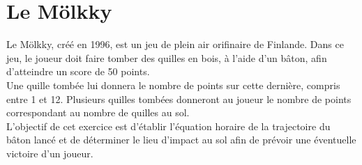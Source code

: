 \documentclass[a4paper,11pt,fleqn]{scrartcl}%
\begin{document}
	\maketitle
\section{Le Mölkky}
Le Mölkky, créé en 1996, est un jeu de plein air orifinaire de Finlande.
Dans ce jeu, le joueur doit faire tomber des quilles en bois, à l'aide d'un bâton, afin d'atteindre un score de 50 points.\\
Une quille tombée lui donnera le nombre de points sur cette dernière, compris entre 1 et 12. Plusieurs quilles tombées donneront au joueur le nombre de points correspondant au nombre de quilles au sol.\\

L'objectif de cet exercice est d'établir l'équation horaire de la trajectoire du bâton lancé et de déterminer le lieu d'impact au sol afin de prévoir une éventuelle victoire d'un joueur.
\end{document}

